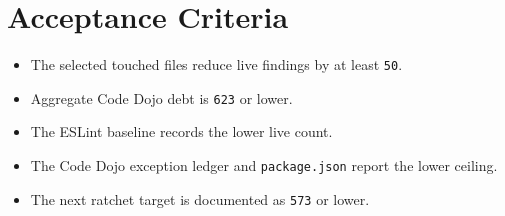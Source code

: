 \section{Acceptance Criteria}\label{record-237-acceptance-criteria}

\begin{itemize}
\tightlist
\item
  The selected touched files reduce live findings by at least \texttt{5\allowbreak{}0}.
\item
  Aggregate Code Dojo debt is \texttt{6\allowbreak{}2\allowbreak{}3} or lower.
\item
  The ESLint baseline records the lower live count.
\item
  The Code Dojo exception ledger and \texttt{p\allowbreak{}a\allowbreak{}c\allowbreak{}k\allowbreak{}a\allowbreak{}g\allowbreak{}e\allowbreak{}.\allowbreak{}j\allowbreak{}s\allowbreak{}o\allowbreak{}n} report the lower ceiling.
\item
  The next ratchet target is documented as \texttt{5\allowbreak{}7\allowbreak{}3} or lower.
\end{itemize}


